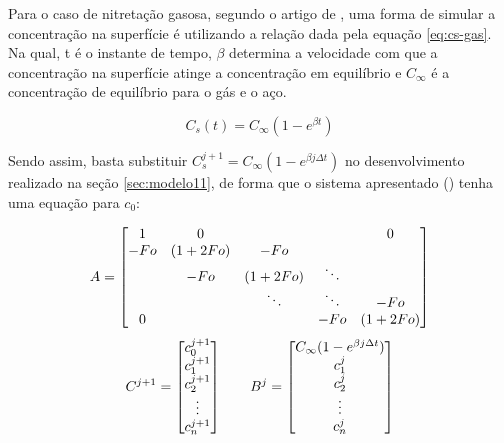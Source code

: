 Para o caso de nitretação gasosa, segundo o artigo de \cite{christiansen2008nitrogen}, uma forma de simular a concentração na superfície é utilizando a relação dada pela equação \autoref{eq:cs-gas}. Na qual, t é o instante de tempo, $\beta$ determina a velocidade com que a concentração na superfície atinge a concentração em equilíbrio e $C_{\infty}$ é a concentração de equilíbrio para o gás e o aço.

\begin{equation}
\label{eq:cs-gas}
C_{s}(t) = C_{\infty}(1 - e^{\beta t})
\end{equation}

Sendo assim, basta substituir $C_s^{j+1} = C_{\infty}(1 - e^{\beta j\Delta t})$ no desenvolvimento realizado na seção \autoref{sec:modelo11}, de forma que o sistema apresentado () tenha uma equação para $c_0$:

\begin{equation*}
	\cmrtext{A} =
	\begin{bmatrix}
		  1 & 0 &         &        & 0\\
		-Fo & (1+2Fo) &  -Fo   &        & \\
		    & -Fo &   (1+2Fo)   & \ddots & \\
		    &     &  \ddots & \ddots & -Fo \\
	     0  &     &         &  -Fo   & (1+2Fo) 
	\end{bmatrix}
\end{equation*}
\begin{equation*}
	\cmrtext{C^{j+1}} =
	\begin{bmatrix}
		c_0^{j+1} \\
		c_1^{j+1} \\
		c_2^{j+1} \\
		\vdots \\
		c_n^{j+1}
	\end{bmatrix}
	\qquad
	\cmrtext{B^j} =	
	\begin{bmatrix}
		C_{\infty}(1 - e^{\beta j\Delta t}) \\
		c_1^j \\
		c_2^{j} \\
		\vdots \\
		c_n^{j}
	\end{bmatrix}
\end{equation*}


